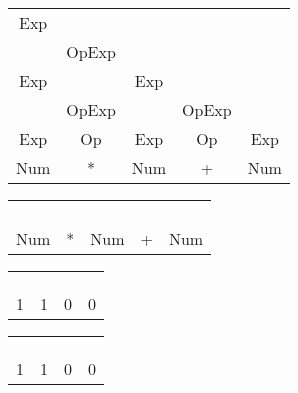 \documentclass[fleqn]{article}
\begin{document}
\begin{tabular}{ | c | c | c | c  | c |}
\cline{1-1}
Exp\\\cline{1-2}
 & OpExp\\\cline{1-3}
Exp &  & Exp \\\cline{1-4}
 & OpExp &  & OpExp \\\cline{1-5}
 Exp & Op & Exp & Op& Exp \\
\hline Num & * & Num & + & Num  \\
\hline

\end{tabular}
\vspace{0.5in}


\begin{tabular}{ | c | c | c | c  | c |}
\cline{1-1}
\\\cline{1-2}
 & \\\cline{1-3}
 &  &  \\\cline{1-4}
 &  &  &  \\\cline{1-5}
 & & & & \\
\hline Num & * & Num & + & Num  \\
\hline

\end{tabular}

\vspace{0.5in}

\begin{tabular}{ | c | c | c | c  | }
\cline{1-1}
\\\cline{1-2}
 & \\\cline{1-3}
 &  &  \\\cline{1-4}
 &  &  &  \\
\hline 1 & 1 & 0 & 0  \\
\hline

\end{tabular}

\vspace{0.5in}

\begin{tabular}{ | c | c | c | c  | }
\cline{1-1}
\\\cline{1-2}
 & \\\cline{1-3}
 &  &  \\\cline{1-4}
 &  &  &  \\
\hline 1 & 1 & 0 & 0  \\
\hline

\end{tabular}

\vspace{0.5in}
\end{document}
